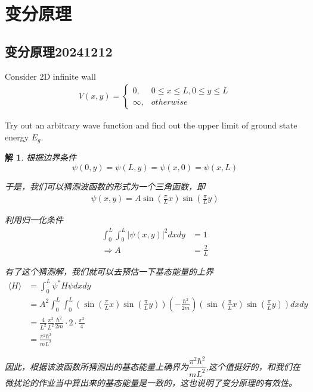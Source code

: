 \documentclass{article}
\newtheorem{solution}{解}
\newcommand{\expectation}[1]{\langle #1 \rangle}
\begin{document}
\section{变分原理}
\subsection{变分原理20241212}
Consider 2D infinite wall 
\begin{align*}
    V(x,y)=
    \begin{cases}
        0,&0\leq x \leq L,0\leq y\leq L\\
        \infty,&otherwise    
    \end{cases}
\end{align*}

Try out an arbitrary wave function and find out the upper limit of ground state energy $E_g$.


\begin{solution}
    根据边界条件
    \[
        \psi(0,y)=\psi(L,y)=\psi(x,0)=\psi(x,L)
    \]

    于是，我们可以猜测波函数的形式为一个三角函数，即
    \begin{align*}
        \psi(x,y)=A\sin(\frac{\pi}{L}x)\sin(\frac{\pi}{L}y)
    \end{align*}

    利用归一化条件
    \begin{align*}
        \int_{0}^{L}\int_{0}^{L}|\psi(x,y)|^2dxdy&=1\\
        \Rightarrow A&=\frac{2}{L}
    \end{align*}

    有了这个猜测解，我们就可以去预估一下基态能量的上界
    \begin{align*}
        \expectation{H}&=\int_{0}^{L}\psi^*H\psi dxdy\\
        &=A^2\int_{0}^{L}\int_{0}^{L}\left(\sin(\frac{\pi}{L}x)\sin(\frac{\pi}{L}y)\right)\left(-\frac{\hbar^2}{2m}\right)\left(\sin(\frac{\pi}{L}x)\sin(\frac{\pi}{L}y)\right)dxdy\\
        &=\frac{4}{L^2}\frac{\pi^2}{L^2}\frac{\hbar^2}{2m}\cdot2\cdot\frac{\pi^2}{4}\\
        &=\frac{\pi^2\hbar^2}{mL^2}
    \end{align*}

    因此，根据该波函数所猜测出的基态能量上确界为$\dfrac{\pi^2\hbar^2}{mL^2}$,这个值挺好的，和我们在微扰论的作业当中算出来的基态能量是一致的，这也说明了变分原理的有效性。
\end{solution}
\end{document}
